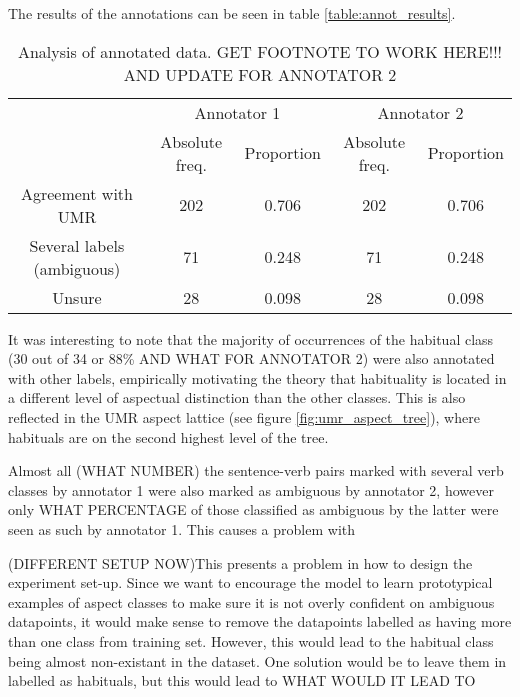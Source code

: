 The results of the annotations can be seen in table \ref{table:annot_results}.

\begin{table}
    \begin{tabular}{|c|c|c|c|c|}\hline
        & \multicolumn{2}{|c|}{Annotator 1} & \multicolumn{2}{|c|}{Annotator 2} \\
         & Absolute freq. & Proportion & Absolute freq. & Proportion  \\ \hline
        Agreement with UMR\footnotemark & 202 & 0.706 & 202 & 0.706 \\ \hline
        Several labels (ambiguous) & 71 & 0.248 & 71 & 0.248 \\\hline
        Unsure & 28 & 0.098 & 28 & 0.098\\\hline
    \end{tabular}
    \caption{Analysis of annotated data. GET FOOTNOTE TO WORK HERE!!! AND UPDATE FOR ANNOTATOR 2}
\end{table}
\label{table:annot_results}

It was interesting to note that the majority of occurrences of the habitual class (30 out of 34 or 88\% AND WHAT FOR ANNOTATOR 2) were also annotated with other labels, empirically motivating the theory that habituality is located in a different level of aspectual distinction than the other classes. This is also reflected in the UMR aspect lattice (see figure \ref{fig:umr_aspect_tree}), where habituals are on the second highest level of the tree. 

Almost all (WHAT NUMBER) the sentence-verb pairs marked with several verb classes by annotator 1 were also marked as ambiguous by annotator 2, however only WHAT PERCENTAGE of those classified as ambiguous by the latter were seen as such by annotator 1. This causes a problem with 

(DIFFERENT SETUP NOW)This presents a problem in how to design the experiment set-up. Since we want to encourage the model to learn prototypical examples of aspect classes to make sure it is not overly confident on ambiguous datapoints, it would make sense to remove the datapoints labelled as having more than one class from training set. However, this would lead to the habitual class being almost non-existant in the dataset. One solution would be to leave them in labelled as habituals, but this would lead to WHAT WOULD IT LEAD TO

